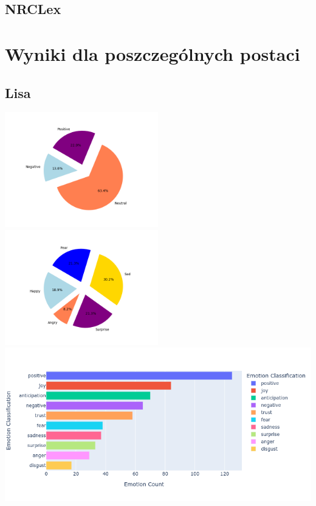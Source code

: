 \documentclass[a4paper,12pt]{article}
\begin{document}
	\subsection{NRCLex}
	\clearpage
	\section {Wyniki dla poszczególnych postaci}
	\subsection{Lisa}
	{\includegraphics[height=5cm]{lisasVaderEmotionalPie.png}}
	{\includegraphics[height=5cm]{lisasEmotionalPie.png}}\\
	{\includegraphics[width=17cm]{lisaNrcImage.png}}\\
	\clearpage
\end{document}
